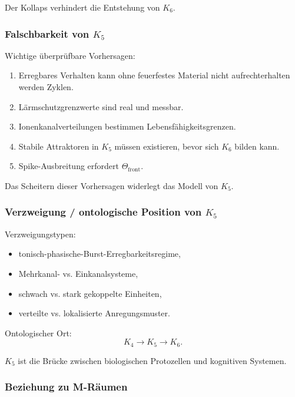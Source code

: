 Der Kollaps verhindert die Entstehung von $K_6$.

\subsubsection{Falschbarkeit von \texorpdfstring{$K_5$}{K_5}}

Wichtige überprüfbare Vorhersagen:
\begin{enumerate}
    \item Erregbares Verhalten kann ohne feuerfestes Material nicht aufrechterhalten werden
          Zyklen.
    \item Lärmschutzgrenzwerte sind real und messbar.
    \item Ionenkanalverteilungen bestimmen Lebensfähigkeitsgrenzen.
    \item Stabile Attraktoren in $K_5$ müssen existieren, bevor sich $K_6$ bilden kann.
    \item Spike-Ausbreitung erfordert $\Theta_{\mathrm{front}}$.
\end{enumerate}

Das Scheitern dieser Vorhersagen widerlegt das Modell von $K_5$.

\subsubsection{Verzweigung / ontologische Position von \texorpdfstring{$K_5$}{K_5}}

Verzweigungstypen:
\begin{itemize}
    \item tonisch-phasische-Burst-Erregbarkeitsregime,
    \item Mehrkanal- vs. Einkanalsysteme,
    \item schwach vs. stark gekoppelte Einheiten,
    \item verteilte vs. lokalisierte Anregungsmuster.
\end{itemize}

Ontologischer Ort:
\[
K_4 \to K_5 \to K_6.
\]

$K_5$ ist die Brücke zwischen biologischen Protozellen und kognitiven Systemen.

\subsubsection{Beziehung zu M-Räumen}

